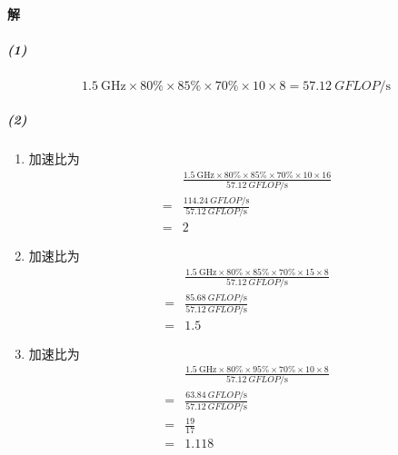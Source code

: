 \documentclass{article}
\begin{document}
\paragraph{解}
\subparagraph{(1)}
$$
    \SI{1.5}{\giga\hertz} \times 80\% \times 85\% \times 70\% \times 10 \times 8 = \SI{57.12}{GFLOP\per\second}
$$
\subparagraph{(2)}
\begin{enumerate}[leftmargin = .2\linewidth, rightmargin = .2\linewidth, label=\textcircled{\arabic*}]
    \item 加速比为
          \begin{align*}
                & \frac{ \SI{1.5}{\giga\hertz} \times 80\% \times 85\% \times 70\% \times 10 \times 16}{\SI{57.12}{GFLOP\per\second}} \\
              = & \frac{\SI{114.24}{GFLOP\per\second}}{\SI{57.12}{GFLOP\per\second}}                                                  \\
              = & 2
          \end{align*}
    \item 加速比为
          \begin{align*}
                & \frac{ \SI{1.5}{\giga\hertz} \times 80\% \times 85\% \times 70\% \times 15 \times 8}{\SI{57.12}{GFLOP\per\second}} \\
              = & \frac{\SI{85.68}{GFLOP\per\second}}{\SI{57.12}{GFLOP\per\second}}                                                  \\
              = & 1.5
          \end{align*}
    \item 加速比为
          \begin{align*}
                & \frac{ \SI{1.5}{\giga\hertz} \times 80\% \times 95\% \times 70\% \times 10 \times 8}{\SI{57.12}{GFLOP\per\second}} \\
              = & \frac{\SI{63.84}{GFLOP\per\second}}{\SI{57.12}{GFLOP\per\second}}                                                  \\
              = & \frac{19}{17}                                                                                                      \\
              = & 1.118
          \end{align*}
\end{enumerate}
\end{document}
